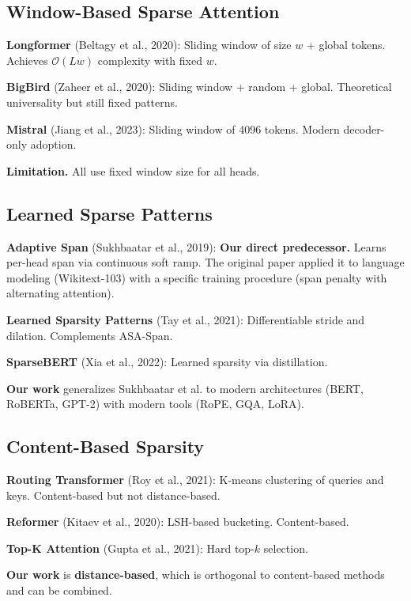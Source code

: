 \subsection{Window-Based Sparse Attention}

\textbf{Longformer} (Beltagy et al., 2020): Sliding window of size $w$ + global 
tokens. Achieves $\mathcal{O}(L w)$ complexity with fixed $w$.

\textbf{BigBird} (Zaheer et al., 2020): Sliding window + random + global. 
Theoretical universality but still fixed patterns.

\textbf{Mistral} (Jiang et al., 2023): Sliding window of 4096 tokens. Modern 
decoder-only adoption.

\textbf{Limitation.} All use fixed window size for all heads.

\subsection{Learned Sparse Patterns}

\textbf{Adaptive Span} (Sukhbaatar et al., 2019): \textbf{Our direct predecessor.} 
Learns per-head span via continuous soft ramp. The original paper applied 
it to language modeling (Wikitext-103) with a specific training procedure 
(span penalty with alternating attention).

\textbf{Learned Sparsity Patterns} (Tay et al., 2021): Differentiable stride 
and dilation. Complements ASA-Span.

\textbf{SparseBERT} (Xia et al., 2022): Learned sparsity via distillation.

\textbf{Our work} generalizes Sukhbaatar et al. to modern architectures (BERT, 
RoBERTa, GPT-2) with modern tools (RoPE, GQA, LoRA).

\subsection{Content-Based Sparsity}

\textbf{Routing Transformer} (Roy et al., 2021): K-means clustering of queries 
and keys. Content-based but not distance-based.

\textbf{Reformer} (Kitaev et al., 2020): LSH-based bucketing. Content-based.

\textbf{Top-K Attention} (Gupta et al., 2021): Hard top-$k$ selection.

\textbf{Our work} is \textbf{distance-based}, which is orthogonal to content-based 
methods and can be combined.

